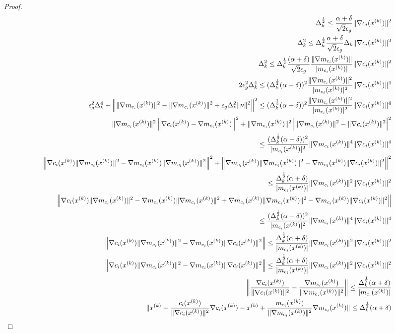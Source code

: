 \begin{proof}
\begin{align*}
\Delta_k^{\frac 1 2} \le \frac{\alpha+\delta}{\sqrt{2}\epsilon_{g}}\|\nabla c_i({x^{(k)}})\|^2\\
\Delta_k^{2} \le \Delta_k^{\frac 1 2}\frac{\alpha+\delta}{\sqrt{2}\epsilon_{g}}\Delta_k\|\nabla c_i({x^{(k)}})\|^2 \\
\Delta_k^{2} \le\Delta_k^{\frac 1 2} \frac{(\alpha + \delta)}{\sqrt{2}\epsilon_{g}}\frac{\|\nabla m_{c_i}({x^{(k)}})\|}{|m_{c_i}({x^{(k)}})|}\|\nabla c_i({x^{(k)}})\|^2\\
2\epsilon_{g}^2\Delta_k^4
\le (\Delta_k^{\frac 1 2}(\alpha + \delta))^2\frac{\|\nabla m_{c_i}({x^{(k)}})\|^2}{|m_{c_i}({x^{(k)}})|^2}\|\nabla c_i({x^{(k)}})\|^4\\
\epsilon_{g}^2\Delta_k^4
+\left\|\|\nabla m_{c_i}({x^{(k)}})\|^2 - \|\nabla m_{c_i}({x^{(k)}})\|^2 + \epsilon_{g}\Delta_k^2\|\nu \|^2 \right\|^2
\le (\Delta_k^{\frac 1 2}(\alpha + \delta))^2\frac{\|\nabla m_{c_i}({x^{(k)}})\|^2}{|m_{c_i}({x^{(k)}})|^2}\|\nabla c_i({x^{(k)}})\|^4\\
\|\nabla m_{c_i}({x^{(k)}})\|^2\left\|\nabla c_i({x^{(k)}}) - \nabla m_{c_i}({x^{(k)}})\right\|^2
+\|\nabla m_{c_i}({x^{(k)}})\|^2\left|\|\nabla m_{c_i}({x^{(k)}})\|^2 - \|\nabla c_i({x^{(k)}})\|^2
\right|^2\\
\le \frac{(\Delta_k^{\frac 1 2}(\alpha + \delta))^2}{|m_{c_i}({x^{(k)}})|^2}\|\nabla m_{c_i}({x^{(k)}})\|^4\|\nabla c_i({x^{(k)}})\|^4\\
\left\|\nabla c_i({x^{(k)}})\|\nabla m_{c_i}({x^{(k)}})\|^2 - \nabla m_{c_i}({x^{(k)}})\|\nabla m_{c_i}({x^{(k)}})\|^2\right\|^2
+\left\|\nabla m_{c_i}({x^{(k)}})\|\nabla m_{c_i}({x^{(k)}})\|^2 - \nabla m_{c_i}({x^{(k)}})\|\nabla c_i({x^{(k)}})\|^2
\right\|^2\\
\le \frac{\Delta_k^{\frac 1 2}(\alpha + \delta)}{|m_{c_i}({x^{(k)}})|}\|\nabla m_{c_i}({x^{(k)}})\|^2\|\nabla c_i({x^{(k)}})\|^2\\
\left\|\nabla c_i({x^{(k)}})\|\nabla m_{c_i}({x^{(k)}})\|^2 - \nabla m_{c_i}({x^{(k)}})\|\nabla m_{c_i}({x^{(k)}})\|^2
+\nabla m_{c_i}({x^{(k)}})\|\nabla m_{c_i}({x^{(k)}})\|^2 - \nabla m_{c_i}({x^{(k)}})\|\nabla c_i({x^{(k)}})\|^2
\right\|\\
\le  \frac{(\Delta_k^{\frac 1 2}(\alpha + \delta))^2}{|m_{c_i}({x^{(k)}})|^2}\|\nabla m_{c_i}({x^{(k)}})\|^4\|\nabla c_i({x^{(k)}})\|^4\\
\left\|\nabla c_i({x^{(k)}})\|\nabla m_{c_i}({x^{(k)}})\|^2 -
\nabla m_{c_i}({x^{(k)}})\|\nabla c_i({x^{(k)}})\|^2
\right\| \le \frac{\Delta_k^{\frac 1 2}(\alpha + \delta)}{|m_{c_i}({x^{(k)}})|}\|\nabla m_{c_i}({x^{(k)}})\|^2\|\nabla c_i({x^{(k)}})\|^2\\
\left\|\nabla c_i({x^{(k)}})\|\nabla m_{c_i}({x^{(k)}})\|^2 -
\nabla m_{c_i}({x^{(k)}})\|\nabla c_i({x^{(k)}})\|^2
\right\| \le \frac{\Delta_k^{\frac 1 2}(\alpha + \delta)}{|m_{c_i}({x^{(k)}})|}\|\nabla m_{c_i}({x^{(k)}})\|^2\|\nabla c_i({x^{(k)}})\|^2\\
\left\|\frac{\nabla c_i({x^{(k)}})}{\|\nabla c_i({x^{(k)}})\|^2} -
\frac{\nabla m_{c_i}({x^{(k)}})}{\|\nabla m_{c_i}({x^{(k)}})\|^2}
\right\| \le \frac{\Delta_k^{\frac 1 2}(\alpha + \delta)}{|m_{c_i}({x^{(k)}})|}\\
\|
{x^{(k)}} - \frac{c_i({x^{(k)}})}{\|\nabla c_i({x^{(k)}})\|^2}\nabla c_i({x^{(k)}}) -
{x^{(k)}} + \frac{m_{c_i}({x^{(k)}})}{\|\nabla m_{c_i}({x^{(k)}})\|^2}\nabla m_{c_i}({x^{(k)}})
\| \le \Delta_k^{\frac 1 2}(\alpha + \delta)\\
\end{align*}

\end{proof}



